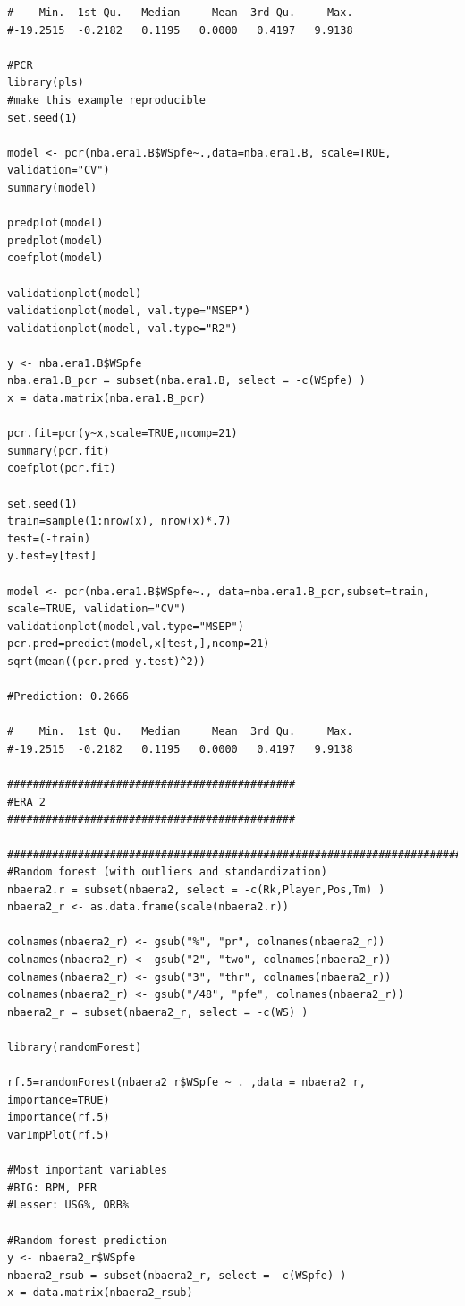\documentclass[11pt,letterpaper]{amsart}
\begin{document}
\begin{lstlisting}[breaklines]
#    Min.  1st Qu.   Median     Mean  3rd Qu.     Max. 
#-19.2515  -0.2182   0.1195   0.0000   0.4197   9.9138

#PCR
library(pls)
#make this example reproducible
set.seed(1)

model <- pcr(nba.era1.B$WSpfe~.,data=nba.era1.B, scale=TRUE, validation="CV")
summary(model)

predplot(model)
predplot(model)
coefplot(model)

validationplot(model)
validationplot(model, val.type="MSEP")
validationplot(model, val.type="R2")

y <- nba.era1.B$WSpfe
nba.era1.B_pcr = subset(nba.era1.B, select = -c(WSpfe) )
x = data.matrix(nba.era1.B_pcr)

pcr.fit=pcr(y~x,scale=TRUE,ncomp=21)
summary(pcr.fit)
coefplot(pcr.fit)

set.seed(1)
train=sample(1:nrow(x), nrow(x)*.7)
test=(-train)
y.test=y[test]

model <- pcr(nba.era1.B$WSpfe~., data=nba.era1.B_pcr,subset=train, scale=TRUE, validation="CV")
validationplot(model,val.type="MSEP")
pcr.pred=predict(model,x[test,],ncomp=21)
sqrt(mean((pcr.pred-y.test)^2))

#Prediction: 0.2666

#    Min.  1st Qu.   Median     Mean  3rd Qu.     Max. 
#-19.2515  -0.2182   0.1195   0.0000   0.4197   9.9138 

#############################################
#ERA 2
#############################################

############################################################################
#Random forest (with outliers and standardization)
nbaera2.r = subset(nbaera2, select = -c(Rk,Player,Pos,Tm) )
nbaera2_r <- as.data.frame(scale(nbaera2.r))

colnames(nbaera2_r) <- gsub("%", "pr", colnames(nbaera2_r))
colnames(nbaera2_r) <- gsub("2", "two", colnames(nbaera2_r))
colnames(nbaera2_r) <- gsub("3", "thr", colnames(nbaera2_r))
colnames(nbaera2_r) <- gsub("/48", "pfe", colnames(nbaera2_r))
nbaera2_r = subset(nbaera2_r, select = -c(WS) )

library(randomForest)

rf.5=randomForest(nbaera2_r$WSpfe ~ . ,data = nbaera2_r, importance=TRUE)
importance(rf.5)
varImpPlot(rf.5)

#Most important variables 
#BIG: BPM, PER  
#Lesser: USG%, ORB%

#Random forest prediction
y <- nbaera2_r$WSpfe
nbaera2_rsub = subset(nbaera2_r, select = -c(WSpfe) )
x = data.matrix(nbaera2_rsub)


\end{lstlisting}
\end{document}
